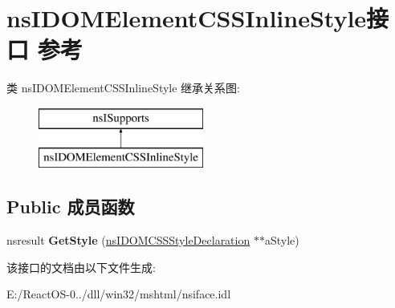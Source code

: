 \hypertarget{interfacens_i_d_o_m_element_c_s_s_inline_style}{}\section{ns\+I\+D\+O\+M\+Element\+C\+S\+S\+Inline\+Style接口 参考}
\label{interfacens_i_d_o_m_element_c_s_s_inline_style}
类 ns\+I\+D\+O\+M\+Element\+C\+S\+S\+Inline\+Style 继承关系图\+:\begin{figure}[H]
\begin{center}
\leavevmode
\includegraphics[height=2.000000cm]{interfacens_i_d_o_m_element_c_s_s_inline_style}
\end{center}
\end{figure}
\subsection*{Public 成员函数}
\begin{DoxyCompactItemize}
\item 
\mbox{\label{interfacens_i_d_o_m_element_c_s_s_inline_style_ab4489c3d8a35909c948ac5eb4f9b6436}} 
nsresult {\bfseries Get\+Style} (\hyperlink{interfacens_i_d_o_m_c_s_s_style_declaration}{ns\+I\+D\+O\+M\+C\+S\+S\+Style\+Declaration} $\ast$$\ast$a\+Style)
\end{DoxyCompactItemize}


该接口的文档由以下文件生成\+:\begin{DoxyCompactItemize}
\item 
E\+:/\+React\+O\+S-\/0../dll/win32/mshtml/nsiface.\+idl\end{DoxyCompactItemize}

